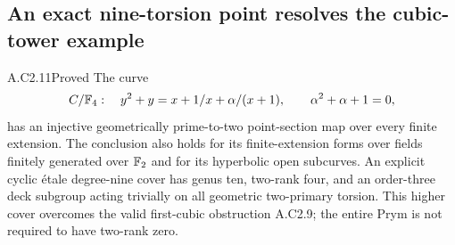 \subsection{An exact nine-torsion point resolves the cubic-tower example}

\begin{claim}{A.C2.11}{Proved}
The curve
\[
 C/\mathbb F_4:\quad y^2+y=x+1/x+\alpha/(x+1),
 \qquad\alpha^2+\alpha+1=0,
\]
has an injective geometrically prime-to-two point-section map over
every finite extension. The conclusion also holds for its
finite-extension forms over fields finitely generated over $\mathbb F_2$
and for its hyperbolic open subcurves. An explicit cyclic \'etale
degree-nine cover has genus ten, two-rank four, and an order-three
deck subgroup acting trivially on all geometric two-primary torsion.
This higher cover overcomes the valid first-cubic obstruction
A.C2.9; the entire Prym is not required to have two-rank zero.
\end{claim}
